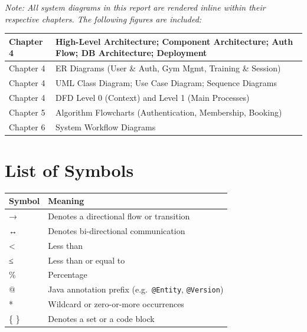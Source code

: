 \documentclass[
  12pt,
  a4paperpaper,
]{report}
\newcounter{none} %
\begin{document}
\listoffigures

\noindent\textit{Note: All system diagrams in this report are rendered inline within their respective chapters. The following figures are included:}

\medskip

\noindent

\noindent\begin{tabularx}{\textwidth}{|p{3cm}|X|}
\hline
Chapter 4 & High-Level Architecture; Component Architecture; Auth Flow; DB Architecture; Deployment \\[3pt]
\hline
Chapter 4 & ER Diagrams (User \& Auth, Gym Mgmt, Training \& Session) \\[3pt]
\hline
Chapter 4 & UML Class Diagram; Use Case Diagram; Sequence Diagrams \\[3pt]
\hline
Chapter 4 & DFD Level 0 (Context) and Level 1 (Main Processes) \\[3pt]
\hline
Chapter 5 & Algorithm Flowcharts (Authentication, Membership, Booking) \\[3pt]
\hline
Chapter 6 & System Workflow Diagrams \\
\hline
\end{tabularx}



\chapter*{List of Symbols}\label{list-of-symbols}


{\def\LTcaptype{none} %
\begin{longtable}[]{@{}ll@{}}
\hline
Symbol & Meaning \\
\hline
\endhead
\hline
\endlastfoot
→ & Denotes a directional flow or transition \\
↔ & Denotes bi-directional communication \\
\textless{} & Less than \\
≤ & Less than or equal to \\
\% & Percentage \\
@ & Java annotation prefix (e.g.~\texttt{@Entity}, \texttt{@Version}) \\
* & Wildcard or zero-or-more occurrences \\
\{ \} & Denotes a set or a code block \\
\end{longtable}
}
\end{document}
